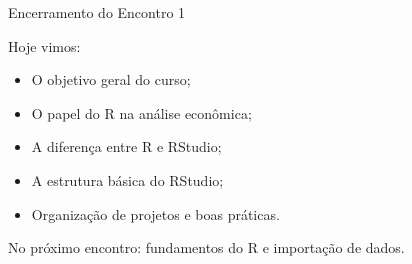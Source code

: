 \documentclass[11pt]{beamer}
\begin{document}
	\begin{frame}{Encerramento do Encontro 1}
		
		Hoje vimos:
		
		\begin{itemize}
			\item O objetivo geral do curso;
			\item O papel do R na análise econômica;
			\item A diferença entre R e RStudio;
			\item A estrutura básica do RStudio;
			\item Organização de projetos e boas práticas.
		\end{itemize}
		
		\vspace{0.4cm}
		
		No próximo encontro: fundamentos do R e importação de dados.
		
	\end{frame}
	
\end{document}
